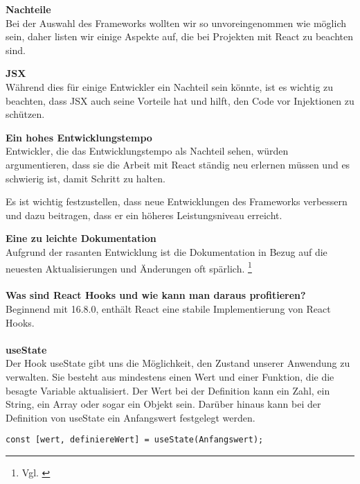 \textbf{Nachteile}\\
Bei der Auswahl des Frameworks wollten wir so unvoreingenommen wie möglich sein, daher listen wir einige Aspekte auf, die bei Projekten mit React zu beachten sind.
\newline

\textbf{JSX}\\
Während dies für einige Entwickler ein Nachteil sein könnte, ist es wichtig zu beachten, dass JSX auch seine Vorteile hat und hilft, den Code vor Injektionen zu schützen.
\newline

\newpage
\textbf{Ein hohes Entwicklungstempo}\\
Entwickler, die das Entwicklungstempo als Nachteil sehen, würden argumentieren, dass sie die Arbeit mit React ständig neu erlernen müssen und es schwierig ist, damit Schritt zu halten.

Es ist wichtig festzustellen, dass neue Entwicklungen des Frameworks verbessern und dazu beitragen, dass er ein höheres Leistungsniveau erreicht. 
\newline

\textbf{Eine zu leichte Dokumentation}\\
Aufgrund der rasanten Entwicklung ist die Dokumentation in Bezug auf die neuesten Aktualisierungen und Änderungen oft spärlich. 
\footnote{ Vgl. \cite{R01}}

\paragraph{}
\textbf{Was sind React Hooks und wie kann man daraus profitieren?}\\
Beginnend mit 16.8.0, enthält React eine stabile Implementierung von React Hooks.

\paragraph{}
\textbf{useState}\\
Der Hook useState gibt uns die Möglichkeit, den Zustand unserer Anwendung zu verwalten. Sie besteht aus mindestens einen Wert und einer Funktion, die die besagte Variable aktualisiert.
Der Wert bei der Definition kann ein Zahl, ein String, ein Array oder sogar ein Objekt sein.
Darüber hinaus kann bei der Definition von useState ein Anfangswert festgelegt werden.

\begin{lstlisting}
const [wert, definiereWert] = useState(Anfangswert);
\end{lstlisting}

